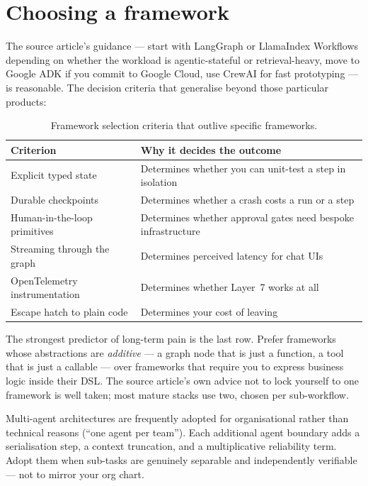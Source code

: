 \documentclass[11pt,twoside,openright]{book}
\theoremstyle{definition}
\theoremstyle{plain}
\theoremstyle{remark}
\begin{document}
\section{Choosing a framework}

The source article's guidance --- start with LangGraph or LlamaIndex Workflows
depending on whether the workload is agentic-stateful or retrieval-heavy, move
to Google ADK if you commit to Google Cloud, use CrewAI for fast prototyping ---
is reasonable. The decision criteria that generalise beyond those particular
products:

\begin{table}[H]
\centering\small
\renewcommand{\arraystretch}{1.3}
\begin{tabularx}{\textwidth}{@{}p{4.2cm} X@{}}
\toprule
\textbf{Criterion} & \textbf{Why it decides the outcome} \\
\midrule
Explicit typed state & Determines whether you can unit-test a step in isolation \\
Durable checkpoints & Determines whether a crash costs a run or a step \\
Human-in-the-loop primitives & Determines whether approval gates need bespoke infrastructure \\
Streaming through the graph & Determines perceived latency for chat UIs \\
OpenTelemetry instrumentation & Determines whether Layer~7 works at all \\
Escape hatch to plain code & Determines your cost of leaving \\
\bottomrule
\end{tabularx}
\caption{Framework selection criteria that outlive specific frameworks.}
\end{table}

\begin{practice}
The strongest predictor of long-term pain is the last row. Prefer frameworks
whose abstractions are \emph{additive} --- a graph node that is just a function,
a tool that is just a callable --- over frameworks that require you to express
business logic inside their DSL. The source article's own advice not to lock
yourself to one framework is well taken; most mature stacks use two, chosen per
sub-workflow.
\end{practice}

\begin{caution}
Multi-agent architectures are frequently adopted for organisational rather than
technical reasons (``one agent per team''). Each additional agent boundary adds
a serialisation step, a context truncation, and a multiplicative reliability
term. Adopt them when sub-tasks are genuinely separable and independently
verifiable --- not to mirror your org chart.
\end{caution}
\end{document}
